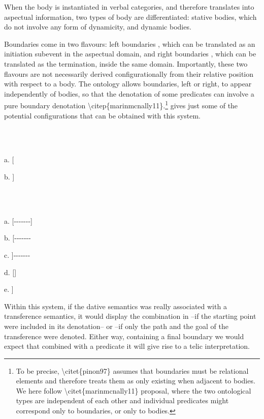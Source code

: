 \documentclass[output=paper,modfonts,nonflat]{langsci/langscibook}
\begin{document}
When the body is instantiated in verbal categories, and therefore translates into aspectual information, two types of body are differentiated: stative bodies, which do not involve any form of dynamicity, and dynamic bodies. 

Boundaries come in two flavours: left boundaries , which can be translated as an initiation subevent in the aspectual domain, and right boundaries , which can be translated as the termination, inside the same domain. Importantly, these two flavours are not necessarily derived configurationally from their relative position with respect to a body. The ontology allows boundaries, left or right, to appear independently of bodies, so that the denotation of some predicates can involve a pure boundary denotation {\textbackslash}citep\{marinmcnally11\}.\footnote{To be precise, {\textbackslash}citet\{pinon97\} assumes that boundaries must be relational elements and therefore treats them as only existing when adjacent to bodies. We here follow {\textbackslash}citet\{marinmcnally11\} proposal, where the two ontological types are independent of each other and individual predicates might correspond only to boundaries, or only to bodies.}  gives just some of the potential configurations that can be obtained with this system.

\ea%
    \label{ex:key:14}
    \gll\\
        \\
    \glt
    \z

          a. [

      b. ]

\ea%
    \label{ex:key:15}
    \gll\\
        \\
    \glt
    \z

          a. [-{}-{}-{}-{}-{}-{}-]

      b. [-{}-{}-{}-{}-{}-{}-

      c. ]-{}-{}-{}-{}-{}-{}-

      d. []

      e. ]

Within this system, if the dative semantics was really associated with a transference semantics, it would display the combination in  –if the starting point were included in its denotation– or  –if only the path and the goal of the transference were denoted. Either way, containing a final boundary we would expect that combined with a predicate it will give rise to a telic interpretation.
\end{document}

